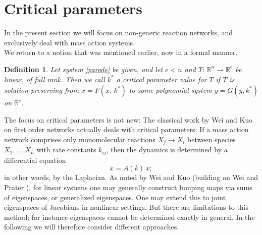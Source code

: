 \documentclass{article}
\newtheorem{definition}{Definition}
\begin{document}

\section{Critical parameters}\label{sec:critpar}


In the present section we will focus on non-generic reaction networks, and exclusively deal with mass action systems.\\ We return to a notion that was mentioned earlier, now in a formal manner.
\begin{definition}
    Let system \eqref{parode} be given, and let $e<n$ and $T:\, \mathbb R^n\to\mathbb R^e$ be linear, of full rank. Then we call $k^*$ a critical parameter value for $T$ if $T$ is solution-preserving from $\dot x=F(x,\,k^*)$ to some polynomial system $\dot y=G(y,k^*)$ on $\mathbb R^e$.
\end{definition}
The focus on critical parameters is not new: The classical work by Wei and Kuo \cite{WK1969a, WK1969b} on first order networks actually deals with critical parameters: If a mass action network comprises only monomolecular reactions  $X_j\rightarrow X_i$ between species $X_1,\ldots,X_n$ with rate constants $k_{ij}$, then the dynamics is determined by a differential equation
\begin{equation}
\dot x = A(k)\,x;
\end{equation}
in other words, by the Laplacian.
As noted by Wei and Kuo \cite{WK1969a,WK1969b} (building on Wei and Prater \cite{WP1962}), for linear systems one may generally construct lumping maps via sums of eigenspaces, or generalized eigenspaces. One may extend this to joint eigenspaces of Jacobians in nonlinear settings.
 But there are limitations to this method; for instance eigenspaces cannot be determined exactly in general. In the following we will therefore consider different approaches.\\
\end{document}

